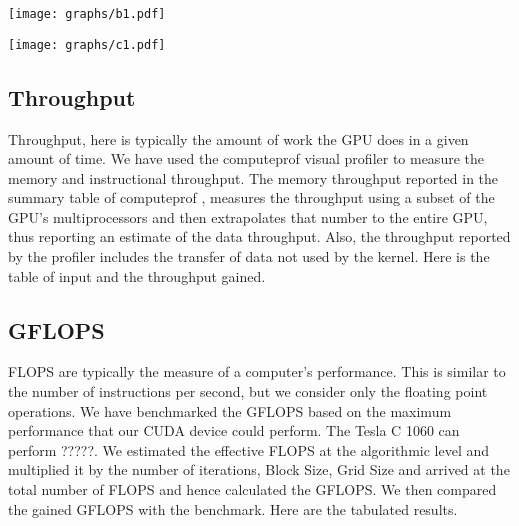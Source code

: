 \documentclass[10pt]{article}
\makeatletter
\newenvironment{figurehere}
{\def\@captype{figure}}
{}
\makeatother
\begin{document}
\begin{multicols}{2}
  \begin{figurehere}
    \centering
    \texttt{[image: graphs/b1.pdf]}
    \caption{}
    \label{fig:time_taken2}
  \end{figurehere}

  \begin{figurehere}
    \centering
    \texttt{[image: graphs/c1.pdf]}
    \caption{}
    \label{fig:time_taken3}
  \end{figurehere}

  \subsection{Throughput}
  Throughput, here is typically the amount of work the GPU does in a given amount of time.
  We have used the computeprof visual profiler to measure the memory and instructional throughput.
  The memory throughput reported in the summary table of computeprof ,  measures  the throughput using a subset of the GPU’s multiprocessors and then extrapolates that number to the entire GPU, thus reporting an estimate of the data throughput.
  Also, the throughput reported by the profiler includes the transfer of data not used by the kernel.
  Here is the table of input and the throughput gained.


  \subsection{GFLOPS}
  FLOPS are typically the measure of a computer’s performance.
  This is similar to the number of instructions per second, but we consider only the floating point operations.
  We have benchmarked the GFLOPS based on the maximum performance that our CUDA device could perform.
  The Tesla C 1060 can perform ?????.
  We estimated the effective FLOPS at the algorithmic level and multiplied it by the number of iterations, Block Size, Grid Size and arrived at the total number of FLOPS and hence calculated the GFLOPS.
  We then compared the gained GFLOPS with the benchmark.
  Here are the tabulated results.


\end{multicols}
\end{document}
